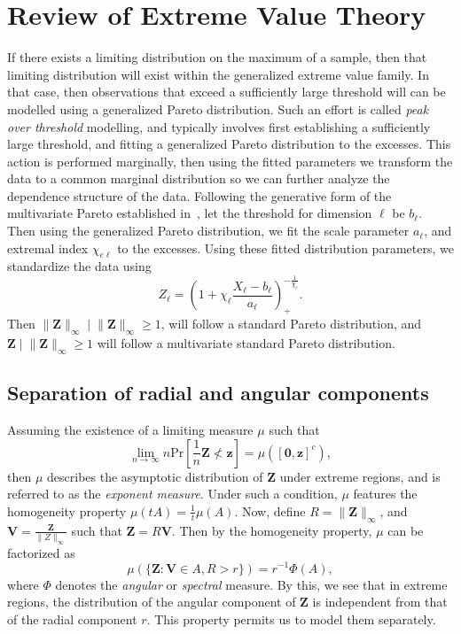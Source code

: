 \section{Review of Extreme Value Theory}
If there exists a limiting distribution on the maximum of a sample, then that limiting 
    distribution will exist within the generalized extreme value family.  In that case, 
    then observations that exceed a sufficiently large threshold will can be modelled using
    a generalized Pareto distribution. Such an effort is called \emph{peak over threshold} 
    modelling, and typically involves first establishing a sufficiently large threshold, 
    and fitting a generalized Pareto distribution to the excesses.  This action is performed
    marginally, then using the fitted parameters we transform the data to a common marginal 
    distribution so we can further analyze the dependence structure of the data.  Following 
    the generative form of the multivariate Pareto established in~\cite{ferreira2014},
    let the threshold for dimension $\ell$ be $b_{\ell}$.  Then using the generalized Pareto 
    distribution, we fit the scale parameter $a_{\ell}$, and extremal index $\chi_{e\ell}$ 
    to the excesses.  
    Using these fitted distribution parameters, we standardize the data using
    \[
        Z_{\ell} = \left(1 + \chi_{\ell}\frac{X_{\ell} - b_{\ell}}{a_{\ell}}\right)_{+}^{-\frac{1}{\chi_{\ell}}}.
    \]
    Then $\lVert \bm{Z}\rVert_{\infty}\mid\lVert \bm{Z}\rVert_{\infty} \geq 1$, will follow
    a standard Pareto distribution, and $\bm{Z}\mid \lVert \bm{Z}\rVert_{\infty} \geq 1$ 
    will follow a multivariate standard Pareto distribution.

\subsection{Separation of radial and angular components}
Assuming the existence of a limiting measure $\mu$ such that
\[
    \lim_{n\to\infty} n\text{Pr}\left[\frac{1}{n}\bm{Z} \not< \bm{z}\right] = \mu\left([\bm{0},\bm{z}]^c\right),
\]
then $\mu$ describes the asymptotic distribution of $\bm{Z}$ under extreme regions, and is 
    referred to as the \emph{exponent measure}.  Under such a condition, $\mu$ features 
    the homogeneity property $\mu(tA) = \frac{1}{t}\mu(A)$.  Now, define 
    $R = \lVert \bm{Z}\rVert_{\infty}$, and $\bm{V} = \frac{\bm{Z}}{\lVert Z\rVert_{\infty}}$
    such that $\bm{Z} = R\bm{V}$.  Then by the homogeneity property, $\mu$ can be factorized as
    \[
        \mu\left(\{\bm{Z} : \bm{V} \in A, R > r\}\right) = r^{-1}\Phi(A),    
    \]
    where $\Phi$ denotes the \emph{angular} or \emph{spectral} measure.  By this, we see 
    that in extreme regions, the distribution of the angular component of $\bm{Z}$ is 
    independent from that of the radial component $r$. This property permits us to model 
    them separately.

